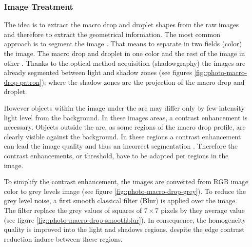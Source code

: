 \documentclass[12pt]{iopart}
\begin{document}
  
\subsubsection{ Image Treatment}
\label{image_treatment}

The idea is to extract the macro drop and droplet shapes 
from the raw images and therefore to extract the geometrical information.
 The most common approach is to segment the image \cite{WANG}. 
That means to separate in two fields (color) the image. The macro drop and droplet in one color and
the rest of the image in other \cite{COCQUEREZ}. Thanks to the optical method acquisition
 (shadowgraphy) the images are already segmented between
light and shadow zones (see figures \ref{fig::photo-macro-drop-patron});
 where the shadow zones are the projection of the macro drop and droplet.

However objects within the image under the arc may differ only by few intensity light level
from the background. In these images areas, a contrast enhancement is necessary. 
Objects outside the arc, as  some regions of the macro drop profile,
 are clearly visible against the background. In these regions a contrast enhancement 
can lead the image quality and thus an incorrect segmentation \cite{NORDBRUCH}.
 Therefore the contrast enhancements, or threshold, have to be adapted per regions in the image.  

To simplify the contrast enhancement, the images are converted from RGB image color 
to grey levels image (see figure \ref{fig::photo-macro-drop-grey}). To 
reduce the grey level noise, a first smooth classical filter 
(Blur) is applied over the image. The filter replace
the grey values of squares of $7\times 7$ 
pixels by they average value (see figure \ref{fig::photo-macro-drop-smoothblur}). 
In consequence, the homogeneity quality is improved into the light and 
shadows regions, despite the edge contrast reduction induce between these regions. 
\end{document}
